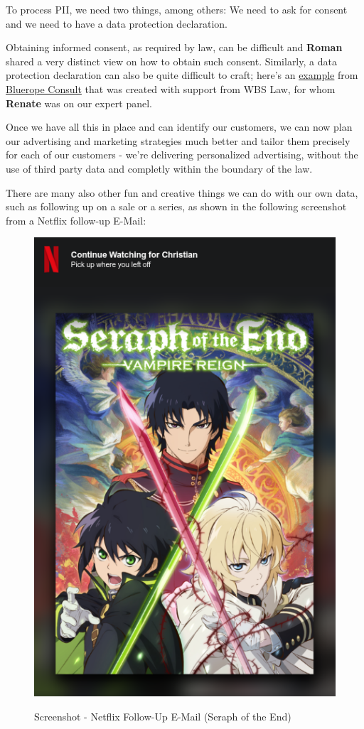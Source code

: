 To process PII, we need two things, among others: We need to ask for consent and we need to have a data protection declaration.

Obtaining informed consent, as required by law, can be difficult and \textbf{Roman} shared a very distinct view on how to obtain such consent. Similarly, a data protection declaration can also be quite difficult to craft; here's an \href{https://blueropeconsultonline.de/datenschutz/}{example} from \href{https://blueropeconsultonline.de/}{Bluerope Consult} that was created with support from WBS Law, for whom \textbf{Renate} was on our expert panel.

Once we have all this in place and can identify our customers, we can now plan our advertising and marketing strategies much better and tailor them precisely for each of our customers - we're delivering personalized advertising, without the use of third party data and completly within the boundary of the law.

There are many also other fun and creative things we can do with our own data, such as following up on a sale or a series, as shown in the following screenshot from a Netflix follow-up E-Mail:

\begin{figure}[H]
\centering
\caption {Screenshot - Netflix Follow-Up E-Mail (Seraph of the End)}
\includegraphics[scale=0.6]{images/continue-seraph.png}
\label{fig:seraph}
\end{figure}

